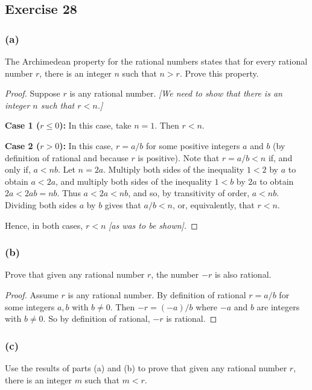 \documentclass[14pt]{extarticle}
\begin{document}
\subsection{Exercise 28}

\subsubsection{(a)}
The Archimedean property for the rational numbers states that for every rational number $r$, there is an integer $n$ such that $n > r$. Prove this property.

\begin{proof}
Suppose $r$ is any rational number. {\it [We need to show that there is an integer $n$ such that $r < n$.]}

{\bf Case 1 ($r \leq 0$):} In this case, take $n = 1$. Then
$r < n$. 

{\bf Case 2 ($r > 0$):} In this case, $r = a/b$ for some positive integers $a$ and $b$ (by definition of rational
and because $r$ is positive). Note that $r = a/b < n$ if, and only if, $a < nb$. Let $n = 2a$. Multiply both sides of 
the inequality $1 < 2$ by $a$ to obtain $a < 2a$, and multiply both sides of the inequality $1 < b$ by $2a$ to 
obtain $2a < 2ab = nb$. Thus $a < 2a < nb$, and so, by transitivity of order, $a < nb$. Dividing both sides $a$ by 
$b$ gives that $a/b < n$, or, equivalently, that $r < n$. 

Hence, in both cases, $r < n$ {\it [as was to be shown].}
\end{proof}

\subsubsection{(b)}
Prove that given any rational number $r$, the number $-r$ is also rational.

\begin{proof}
Assume $r$ is any rational number.
By definition of rational $r = a/b$ for some integers $a,b$ with $b \neq 0$.
Then $-r = (-a)/b$ where $-a$ and $b$ are integers with $b \neq 0$.
So by definition of rational, $-r$ is rational.
\end{proof}

\subsubsection{(c)}
Use the results of parts (a) and (b) to prove that given any rational number $r$, there is an integer $m$ such that $m < r$.
\end{document}
